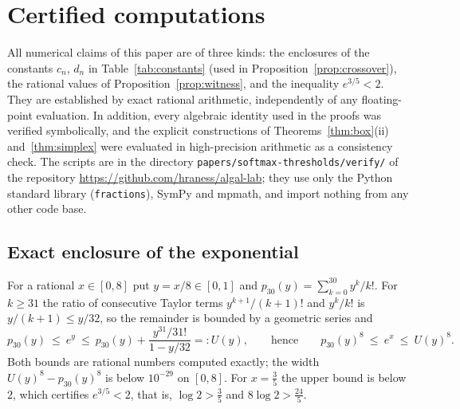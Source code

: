 \documentclass[11pt,a4paper]{article}
\theoremstyle{plain}
\theoremstyle{definition}
\begin{document}
\section{Certified computations}\label{sec:certified}

All numerical claims of this paper are of three kinds: the enclosures of the constants $c_n$, $d_n$ in Table~\ref{tab:constants} (used in Proposition~\ref{prop:crossover}), the rational values of Proposition~\ref{prop:witness}, and the inequality $e^{3/5}<2$. They are established by exact rational arithmetic, independently of any floating-point evaluation. In addition, every algebraic identity used in the proofs was verified symbolically, and the explicit constructions of Theorems~\ref{thm:box}(ii) and~\ref{thm:simplex} were evaluated in high-precision arithmetic as a consistency check. The scripts are in the directory \texttt{papers/softmax-thresholds/verify/} of the repository \url{https://github.com/hraness/algal-lab}; they use only the Python standard library (\texttt{fractions}), SymPy and mpmath, and import nothing from any other code base.

\subsection{Exact enclosure of the exponential}
For a rational $x\in[0,8]$ put $y=x/8\in[0,1]$ and $p_{30}(y)=\sum_{k=0}^{30}y^k/k!$. For $k\ge 31$ the ratio of consecutive Taylor terms $y^{k+1}/(k+1)!$ and $y^k/k!$ is $y/(k+1)\le y/32$, so the remainder is bounded by a geometric series and
\[
p_{30}(y)\ \le\ e^{y}\ \le\ p_{30}(y)+\frac{y^{31}/31!}{1-y/32}=:U(y),
\qquad\text{hence}\qquad p_{30}(y)^8\ \le\ e^{x}\ \le\ U(y)^8 .
\]
Both bounds are rational numbers computed exactly; the width $U(y)^8-p_{30}(y)^8$ is below $10^{-29}$ on $[0,8]$. For $x=\tfrac35$ the upper bound is below $2$, which certifies $e^{3/5}<2$, that is, $\log 2>\tfrac35$ and $8\log 2>\tfrac{24}{5}$.
\end{document}
